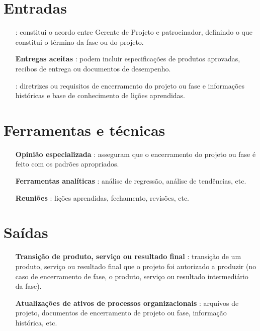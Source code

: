 \section{Entradas}

\begin{itemize}
	
	\item[\textbf{\planproj}]: constitui o acordo entre Gerente de Projeto e patrocinador, definindo o que constitui o término da fase ou do projeto.
	
	\item[\textbf{Entregas aceitas}]: podem incluir especificações de produtos aprovadas, recibos de entrega ou documentos de desempenho.
	
	\item[\textbf{\ativ}]: diretrizes ou requisitos de encerramento do projeto ou fase e informações históricas e base de conhecimento de lições aprendidas.
	
\end{itemize}

\section{Ferramentas e técnicas}

\begin{itemize}
	
	\item[\textbf{Opinião especializada}]: asseguram que o encerramento do projeto ou fase é feito com os padrões apropriados.
	
	\item[\textbf{Ferramentas analíticas}]: análise de regressão, análise de tendências, etc.

	\item[\textbf{Reuniões}]: lições aprendidas, fechamento, revisões, etc.
	

\end{itemize}

\section{Saídas}

\begin{itemize}
		
	\item[\textbf{Transição de produto, serviço ou resultado final}] : transição de um produto, serviço ou resultado final que o projeto foi autorizado a produzir (no caso de encerramento de fase, o produto, serviço ou resultado intermediário da fase).
	
	\item[\textbf{Atualizações de ativos de processos organizacionais}] : arquivos de projeto, documentos de encerramento de projeto ou fase, informação histórica, etc.
	
\end{itemize}

